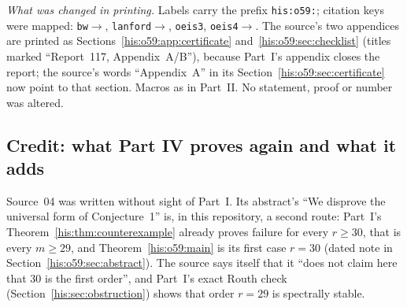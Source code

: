 \documentclass[11pt]{article}
\theoremstyle{remark}\newtheorem{remark}[theorem]{Remark}
\numberwithin{equation}{section}
\begin{document}
\emph{What was changed in printing.} Labels carry the prefix \texttt{his:o59:}; citation keys were mapped: \texttt{bw}$\to$\cite{bw2026}, \texttt{lanford}$\to$\cite{lanford1997}, \texttt{oeis3}, \texttt{oeis4}$\to$\cite{oeis,oeisr4}. The source's two appendices are printed as Sections~\ref{his:o59:app:certificate} and~\ref{his:o59:sec:checklist} (titles marked ``Report~117, Appendix~A/B''), because Part~I's appendix closes the report; the source's words ``Appendix~A'' in its Section~\ref{his:o59:sec:certificate} now point to that section. Macros as in Part~II. No statement, proof or number was altered.

\subsection{Credit: what Part IV proves again and what it adds}\label{his:o59:sec:map}
Source~04 was written without sight of Part~I. Its abstract's ``We disprove the universal form of Conjecture~1'' is, in this repository, a second route: Part~I's Theorem~\ref{his:thm:counterexample} already proves failure for every $r\ge30$, that is every $m\ge29$, and Theorem~\ref{his:o59:main} is its first case $r=30$ (dated note in Section~\ref{his:o59:sec:abstract}). The source says itself that it ``does not claim here that $30$ is the first order'', and Part~I's exact Routh check (Section~\ref{his:sec:obstruction}) shows that order $r=29$ is spectrally stable.
\end{document}

